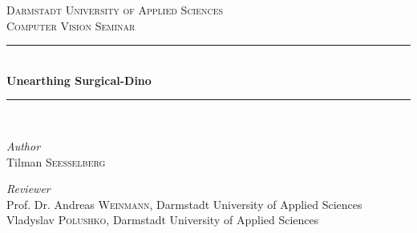 
\begin{titlepage} %
	\newcommand{\HRule}{\rule{\linewidth}{0.5mm}} %
	
	\center %
	
	
	\textsc{\LARGE Darmstadt University of Applied Sciences}\\[1.5cm] %
	
	\textsc{\Large Computer Vision Seminar}\\[0.5cm] %
	
	
	
	\HRule\\[0.4cm]
	
	{\huge\bfseries Unearthing Surgical-Dino}\\[0.4cm] %
	
	\HRule\\[1.5cm]
	

	\begin{flushleft}
		\large
		\textit{Author}\\
		Tilman \textsc{Seeßelberg} %
	\end{flushleft}

	\begin{flushleft}
		\large
		\textit{Reviewer}\\
		Prof. Dr. Andreas \textsc{Weinmann}, Darmstadt University of Applied Sciences\\
        Vladyslav \textsc{Polushko}, Darmstadt University of Applied Sciences\\
	\end{flushleft}	
%		


\end{titlepage}
